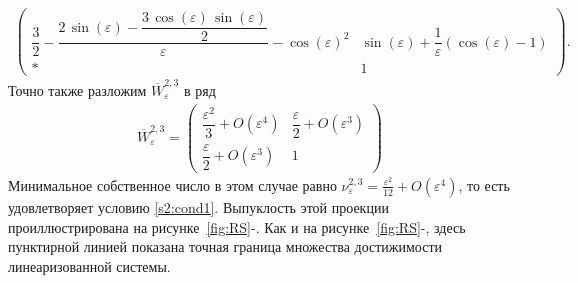 \documentclass[../main.tex]{subfiles}
\begin{document}
\begin{enumerate}
\begin{gather*}
\begin{pmatrix}
 \dfrac{3}{2}-\dfrac{2\,\sin\left(\varepsilon \right)-\dfrac{3\,\cos\left(\varepsilon \right)\,\sin\left(\varepsilon \right)}{2}}{\varepsilon }-{\cos\left(\varepsilon \right)}^2 & \sin\left(\varepsilon \right)+\dfrac{1}{\varepsilon } \left(\cos\left(\varepsilon \right)-1 \right)\\[8pt]
 * & 
 1 
 \end{pmatrix}.
 \end{gather*}
 Точно также разложим $ \overline{W}_{\varepsilon}^{2,3} $ в ряд
 \begin{gather*}
 \overline{W}_{\varepsilon}^{2,3} = \begin{pmatrix}
 \dfrac{\varepsilon^2}{3} + O(\varepsilon^4) &
 \dfrac{\varepsilon }{2} + O(\varepsilon^3) \\[8pt]
 \dfrac{\varepsilon }{2} + O(\varepsilon^3) & 1
 \end{pmatrix}
 \end{gather*}
 Минимальное собственное число в этом случае равно $ \nu^{2,3}_{\varepsilon} = \frac{\varepsilon^2}{12} + O(\varepsilon^4) $, то есть удовлетворяет условию \eqref{s2:cond1}. 
Выпуклость этой проекции проиллюстрирована на рисунке~\ref{fig:RS}-. 
Как и на рисунке~\ref{fig:RS}-, здесь пунктирной линией показана точная граница множества достижимости линеаризованной системы.
 \end{enumerate}
\end{document}

